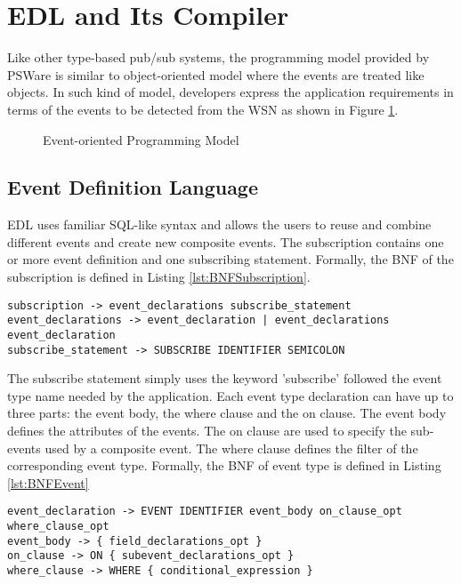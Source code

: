 \section{EDL and Its Compiler}
Like other type-based pub/sub systems, the programming model provided by PSWare is similar to object-oriented model where the events are treated like objects. In such kind of model, developers express the application requirements in terms of the events to be detected from the WSN as shown in Figure \ref{fig:eventprogramming}.

\begin{figure}
\centering
{}
\caption{Event-oriented Programming Model}
\label{fig:eventprogramming}
\end{figure}

\subsection{Event Definition Language}
EDL uses familiar SQL-like syntax and allows the users to reuse and combine different events and create new composite events. The subscription contains one or more event definition and one subscribing statement. Formally, the BNF of the subscription is defined in Listing \ref{lst:BNFSubscription}.

\begin{lstlisting}[caption=BNF (simplified) of subscription, label=lst:BNFSubscription]
subscription -> event_declarations subscribe_statement
event_declarations -> event_declaration | event_declarations event_declaration
subscribe_statement -> SUBSCRIBE IDENTIFIER SEMICOLON
\end{lstlisting}

The subscribe statement simply uses the keyword 'subscribe' followed the event type name needed by the application. Each event type declaration can have up to three parts: the event body, the where clause and the on clause. The event body defines the attributes of the events. The on clause are used to specify the sub-events used by a composite event. The where clause defines the filter of the corresponding event type. Formally, the BNF of event type is defined in Listing \ref{lst:BNFEvent}

\begin{lstlisting}[caption=BNF (simplified) of event type, label=lst:BNFEvent]
event_declaration -> EVENT IDENTIFIER event_body on_clause_opt where_clause_opt
event_body -> { field_declarations_opt }
on_clause -> ON { subevent_declarations_opt }
where_clause -> WHERE { conditional_expression }
\end{lstlisting}

